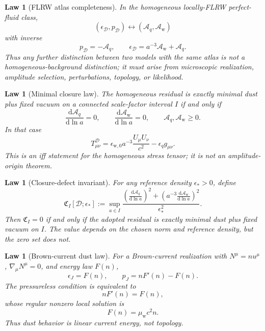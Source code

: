 \documentclass[
  aps,
  prd,
  reprint,
  superscriptaddress,
  floatfix,
  nofootinbib,
  longbibliography
]{revtex4-2}
\theoremstyle{plain}
\newtheorem{law}[theorem]{Law}
\theoremstyle{definition}
\theoremstyle{remark}
\newcommand{\dd}{\mathrm d}
\newcommand{\D}{\mathcal D}
\newcommand{\wind}{\mathrm w}
\newcommand{\Aq}{\mathcal A_q}
\newcommand{\Aw}{\mathcal A_{\mathrm w}}
\newcommand{\eps}{\epsilon}
\begin{document}
\begin{law}[FLRW atlas completeness]
In the homogeneous locally-FLRW perfect-fluid class,
\begin{equation}
(\eps_\D,p_\D)\longleftrightarrow(\Aq,\Aw)
\end{equation}
with inverse
\begin{equation}
p_\D=-\Aq,
\qquad
\eps_\D=a^{-3}\Aw+\Aq .
\label{eq:standard_atlas_inverse}
\end{equation}
Thus any further distinction between two models with the same atlas is not a
homogeneous-background distinction; it must arise from microscopic realization,
amplitude selection, perturbations, topology, or likelihood.
\end{law}

\begin{law}[Minimal closure law]
The homogeneous residual is exactly minimal dust plus fixed vacuum on a connected
scale-factor interval \(I\) if and only if
\begin{equation}
\frac{\dd\Aq}{\dd\ln a}=0,
\qquad
\frac{\dd\Aw}{\dd\ln a}=0,
\qquad
\Aq,\Aw\ge0 .
\label{eq:standard_minimal_closure_law}
\end{equation}
In that case
\begin{equation}
T^\D_{\mu\nu}
=
\eps_{\wind,0}a^{-3}\frac{U_\mu U_\nu}{c^2}
-
\eps_qg_{\mu\nu}.
\label{eq:standard_minimal_tensor}
\end{equation}
This is an iff statement for the homogeneous stress tensor; it is not an
amplitude-origin theorem.
\end{law}

\begin{law}[Closure-defect invariant]
For any reference density \(\eps_*>0\), define
\begin{equation}
\mathfrak C_I[\D;\eps_*]
:=
\sup_{a\in I}
\frac{
\left(\frac{\dd\Aq}{\dd\ln a}\right)^2+
\left(a^{-3}\frac{\dd\Aw}{\dd\ln a}\right)^2
}{\eps_*^2} .
\label{eq:standard_closure_defect}
\end{equation}
Then \(\mathfrak C_I=0\) if and only if the adopted residual is exactly minimal
dust plus fixed vacuum on \(I\).  The value depends on the chosen norm and
reference density, but the zero set does not.
\end{law}

\begin{law}[Brown-current dust law]
For a Brown-current realization with \(N^\mu=nu^\mu\), \(\nabla_\mu N^\mu=0\),
and energy law \(F(n)\),
\begin{equation}
\eps_J=F(n),
\qquad
p_J=nF'(n)-F(n).
\end{equation}
The pressureless condition is equivalent to
\begin{equation}
nF'(n)=F(n),
\end{equation}
whose regular nonzero local solution is
\begin{equation}
F(n)=\mu_{\wind}c^2n.
\label{eq:standard_brown_dust_law}
\end{equation}
Thus dust behavior is linear current energy, not topology.
\end{law}
\end{document}
